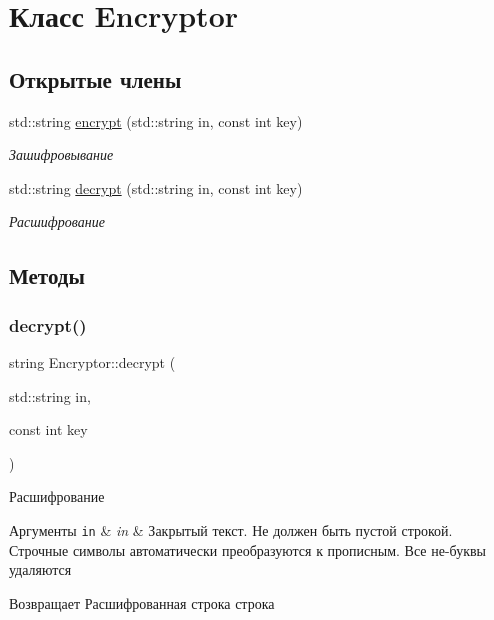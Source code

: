 \hypertarget{classEncryptor}{}\section{Класс Encryptor}
\label{classEncryptor}
\subsection*{Открытые члены}
\begin{DoxyCompactItemize}
\item 
std\+::string \hyperlink{classEncryptor_abbf2ea9dfa0bcf5204375fc2a821f19d}{encrypt} (std\+::string in, const int key)
\begin{DoxyCompactList}\small\item\em Зашифровывание \end{DoxyCompactList}\item 
std\+::string \hyperlink{classEncryptor_ae9f30a56e6d72cf86e080fd08b602d97}{decrypt} (std\+::string in, const int key)
\begin{DoxyCompactList}\small\item\em Расшифрование \end{DoxyCompactList}\end{DoxyCompactItemize}


\subsection{Методы}
\mbox{\label{classEncryptor_ae9f30a56e6d72cf86e080fd08b602d97}} 
\subsubsection{\texorpdfstring{decrypt()}{decrypt()}}
{\footnotesize\ttfamily string Encryptor\+::decrypt (\begin{DoxyParamCaption}\item[{std\+::string}]{in,  }\item[{const int}]{key }\end{DoxyParamCaption})}



Расшифрование 


\begin{DoxyParams}[1]{Аргументы}
\mbox{\tt in}  & {\em in} & Закрытый текст. Не должен быть пустой строкой. Строчные символы автоматически преобразуются к прописным. Все не-\/буквы удаляются \\
\hline
\end{DoxyParams}
\begin{DoxyReturn}{Возвращает}
Расшифрованная строка строка 
\end{DoxyReturn}

